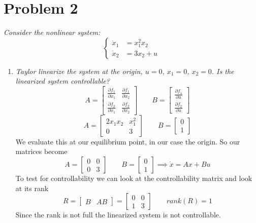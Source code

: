 \documentclass{article}
\begin{document}
\section*{Problem 2}
\emph{Consider the nonlinear system:}
$$
\begin{cases}
\dot{x}_1   &= x_1^2x_2 \\
\dot{x}_2   &= 3x_2 + u
\end{cases}
$$
\begin{enumerate}[(1)]
\item \emph{Taylor linearize the system at the origin, $u = 0$, $x_1 = 0$, $x_2 = 0$.
            Is the linearized system controllable?}
\newline
\newline
$$
A
=
\begin{bmatrix}
\frac{\partial f_1}{\partial x_1} & \frac{\partial f_1}{\partial x_2} \\
\frac{\partial f_2}{\partial x_1} & \frac{\partial f_2}{\partial x_2}
\end{bmatrix}
\qquad
B
=
\begin{bmatrix}
\frac{\partial f_1}{\partial u} \\
\frac{\partial f_2}{\partial u}
\end{bmatrix}
$$
$$
A
=
\begin{bmatrix}
2x_1x_2 & x_1^2\\
0 & 3
\end{bmatrix}
\qquad
B
=
\begin{bmatrix}
0 \\
1
\end{bmatrix}
$$
We evaluate this at our equilibrium point, in our case the origin.
So our matrices become
$$
A
=
\begin{bmatrix}
0 & 0 \\
0 & 3
\end{bmatrix}
\qquad
B
=
\begin{bmatrix}
0 \\
1
\end{bmatrix}
\implies
\dot{x} = Ax + Bu
$$
To test for controllability we can look at the controllability matrix and look at its rank
$$
R = \begin{bmatrix} B & AB \end{bmatrix}
=
\begin{bmatrix}
0 & 0 \\
1 & 3
\end{bmatrix}
\qquad
rank(R) = 1
$$
Since the rank is not full the linearized system is not controllable.


\end{enumerate}
\end{document}
